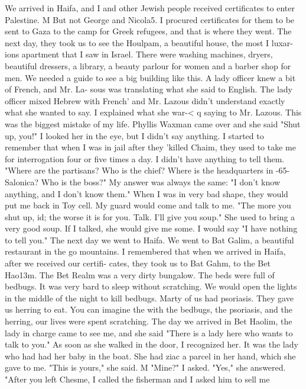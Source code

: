 We arrived in Haifa, and I and other Jewish people received certificates to enter 
Palestine. M But not George and Nicola5. I procured certificates for them to be sent 
to Gaza to the camp for Greek refugees, and that is where they went. 
The next day, they took us to see the Houlpam, a beautiful house, the most I luxar-
ions apartment that I saw in Israel. There were washing machines, dryers, beautiful 
dressers, a library, a beauty parlour for women and a barber shop for men. We needed a 
guide to see a big building like this. A lady officer knew a bit of French, and Mr. La-
sous was translating what she said to English. The lady officer mixed Hebrew with French' 
and Mr. Lazous didn't understand exactly what she wanted to say. I explained what she war-<
q 
saying to Mr. Lazous. This was the biggest mistake of my life. Phyllis Waxman came over 
and she said "Shut up, you!" I looked her in the eye, but I didn't say anything. 
I started to remember that when I was in jail after they 'killed Chaim, they used to 
take me for interrogation four or five times a day. I didn't have anything to tell 
them. "Where are the partisans? Who is the chief? Where is the headquarters in 
-65- 
Salonica? Who is the boss?" My answer was always the same: "I don't know anything, 
and I don't know them." When I was in very bad shape, they would put me back in Toy cell. 
My guard would come and talk to me. "The more you shut up, id; the worse it is for you. 
Talk. I'll give you soup." She used to bring a very good soup. If I talked, she would 
give me some. I would say "I have nothing to tell you." 
The next day we went to Haifa. We went to Bat Galim, a beautiful restaurant in the 
go 
mountains. I remembered that when we arrived in Haifa, after we received our certifi-
cates, they took us to Bat Gahm, to the Bet Hao13m. 
The Bet Realm was a very dirty bungalow. The beds were full of bedbugs. It was very 
bard to sleep without scratching. We would open the lights in the middle of the night to 
kill bedbugs. Marty of us had psoriasis. They gave us herring to eat. You can imagine the 
with the bedbugs, the psoriasis, and the herring, our lives were spent scratching. 
The day we arrived in Bet Haolim, the lady in charge came to see me, and she said 
"There is a lady here who wants to talk to you." As soon as she walked in the door, I 
recognized her. It was the lady who had had her baby in the boat. She had ziac a parcel 
in her hand, which she gave to me. "This is yours," she said. M "Mine?" I asked. "Yes," 
she answered. "After you left Chesme, I called the fisherman and I asked him to sell me 

